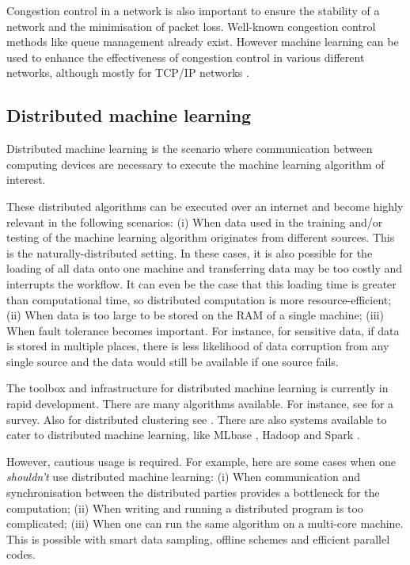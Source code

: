 \documentclass[twocolumn, aps, rmp, amsmath, amssymb, nofootinbib, superscriptaddress, longbibliography, floatfix, table-of-contents, eqsecnum]{revtex4-2}
\begin{document}
Congestion control in a network is also important to ensure the stability of a network and the minimisation of packet loss. Well-known congestion control methods like queue management already exist. However machine learning can be used to enhance the effectiveness of congestion control in various different networks, although mostly for TCP/IP networks \cite{liu2002end, barman2004model, el2005improving}. 

\subsection{Distributed machine learning}
Distributed machine learning is the scenario where communication between computing devices are necessary to execute the machine learning algorithm of interest.

These distributed algorithms can be executed over an internet and become highly relevant in the following scenarios: (i) When data used in the training and/or testing of the machine learning algorithm originates from different sources. This is the naturally-distributed setting. In these cases, it is also possible for the loading of all data onto one machine and transferring data may be too costly and interrupts the workflow. It can even be the case that this loading time is greater than computational time, so distributed computation is more resource-efficient; (ii) When data is too large to be stored on the RAM of a single machine; (iii) When fault tolerance becomes important. For instance, for sensitive data, if data is stored in multiple places, there is less likelihood of data corruption from any single source and the data would still be available if one source fails.

The toolbox and infrastructure for distributed machine learning is currently in rapid development. There are many algorithms available. For instance, see \cite{peteiro2013survey} for a survey. Also for distributed clustering see \cite{florian2013}. There are also systems available to cater to distributed machine learning, like MLbase \cite{MLbase}, Hadoop \cite{white2012hadoop} and Spark \cite{shanahan2015large}.

However, cautious usage is required. For example, here are some cases when one \textit{shouldn't} use distributed machine learning: (i) When communication and synchronisation between the distributed parties provides a bottleneck for the computation; (ii) When writing and running a distributed program is too complicated; (iii) When one can run the same algorithm on a multi-core machine. This is possible with smart data sampling, offline
schemes and efficient parallel codes. 
\end{document}

